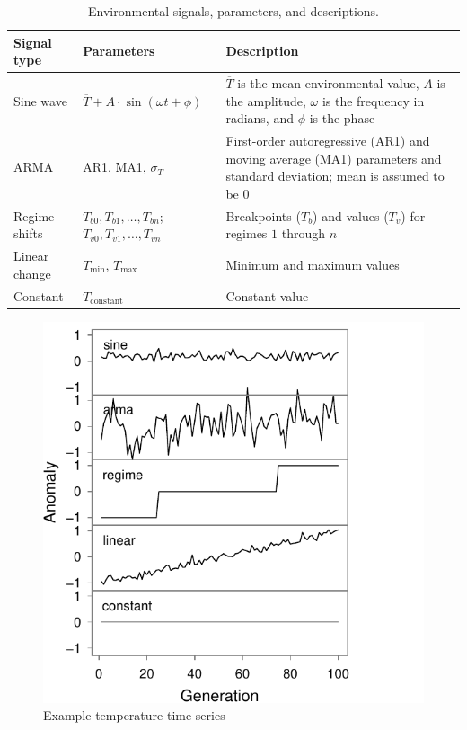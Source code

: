 \documentclass[12pt]{article}
\begin{document}
\begin{table}[h!]
  \centering
  \small
  \caption{Environmental signals, parameters, and descriptions.}
\begin{tabular}{p{3.2cm}p{3.25cm}p{6.8cm}}
\toprule
Signal type & Parameters & Description \\
\midrule
Sine wave & $\overline{T} + A \cdot \sin(\omega t + \phi)$& $\overline{T}$ is 
the mean environmental value, $A$ is the amplitude, $\omega$ is the frequency in 
radians, and $\phi$ is the phase\\
ARMA & AR1, MA1, $\sigma_T$ & First-order autoregressive (AR1) and moving 
average (MA1) parameters and standard deviation; mean is assumed to be 0\\
Regime shifts & $T_{b0},T_{b1}, \ldots, T_{bn}$; $T_{v0},T_{v1}, \ldots, T_{vn}$ 
& Breakpoints ($T_{b}$) and values ($T_v$) for regimes $1$ through $n$\\
Linear change & $T_{\mathrm{min}}$, $T_{\mathrm{max}}$ & Minimum and maximum 
values\\
Constant & $T_{\mathrm{constant}}$& Constant value\\
\bottomrule
\end{tabular}
\label{tab:env-types}
\end{table}

\begin{figure}[htbp]
\centering
\includegraphics{figure/env-ts.pdf}
\caption{Example temperature time series\label{fig:env-ts}}
\end{figure}
\end{document}
